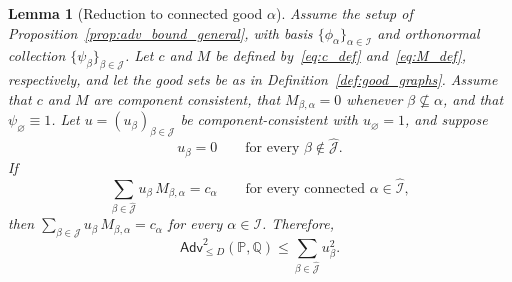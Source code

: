 \documentclass[11pt, letterpaper]{article}
\newtheorem{lemma}[theorem]{Lemma}
\numberwithin{equation}{section}
\newcommand{\Adv}{\mathsf{Adv}}
\newcommand{\PP}{\mathbb{P}}
\newcommand{\QQ}{\mathbb{Q}}
\newcommand{\goodI}{\widehat{\mathcal{I}}}
\newcommand{\goodJ}{\widehat{\mathcal{J}}}
\begin{document}
\begin{lemma}[Reduction to connected good $\alpha$]
\label{lem:reduction_good}
Assume the setup of Proposition~\ref{prop:adv_bound_general}, with basis
$\{\phi_\alpha\}_{\alpha\in\mathcal I}$ and orthonormal collection
$\{\psi_\beta\}_{\beta\in\mathcal J}$. Let $c$ and $M$ be defined
by~\eqref{eq:c_def} and~\eqref{eq:M_def}, respectively, and let the good sets be
as in Definition~\ref{def:good_graphs}. Assume that $c$ and $M$ are component consistent, that $M_{\beta,\alpha}=0$ whenever $\beta\not\subseteq\alpha$, and that $\psi_\varnothing\equiv1$. Let $u=(u_\beta)_{\beta\in\mathcal J}$ be component-consistent with $u_\varnothing=1$, and suppose
\begin{equation}\label{eq:u_zero_on_bad}
u_\beta = 0 \qquad \text{for every } \beta\notin \goodJ.
\end{equation}
If 
\begin{equation}\label{eq:u_connected_good}
\sum_{\beta\in\hat{\mathcal J}} u_\beta\, M_{\beta,\alpha} = c_\alpha
\qquad \text{for every connected } \alpha\in\goodI,
\end{equation}
then $\sum_{\beta\in\mathcal J} u_\beta\, M_{\beta,\alpha} = c_\alpha$ for every
$\alpha\in\mathcal I$. Therefore, $$\Adv^2_{\leq D}(\PP,\QQ) \leq \sum_{\beta\in\goodJ} u_\beta^2.$$
\end{lemma}
%
\end{document}
